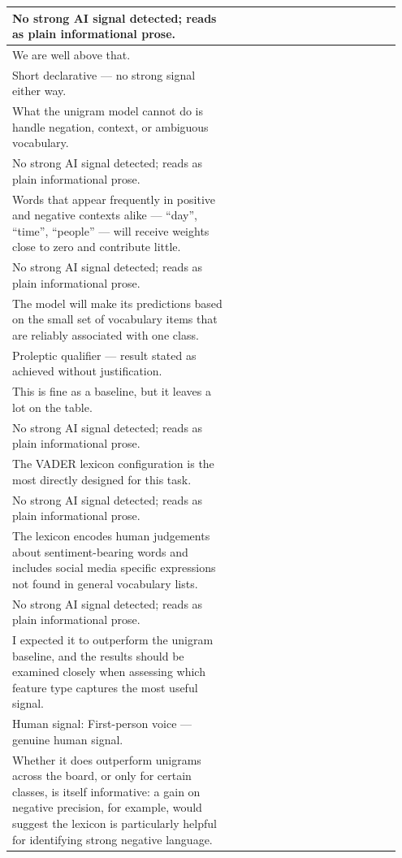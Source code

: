 \documentclass[11pt]{article}
\begin{document}
\begin{longtable}{|p{0.55\linewidth}|p{0.40\linewidth}|}
\hline
No strong AI signal detected; reads as plain informational prose. & \\
\hline
We are well above that. & \\[2pt]
\hline
Short declarative --- no strong signal either way. & \\
\hline
What the unigram model cannot do is handle negation, context, or ambiguous vocabulary. & \\[2pt]
\hline
No strong AI signal detected; reads as plain informational prose. & \\
\hline
Words that appear frequently in positive and negative contexts alike --- ``day'', ``time'', ``people'' --- will receive weights close to zero and contribute little. & \\[2pt]
\hline
No strong AI signal detected; reads as plain informational prose. & \\
\hline
The model will make its predictions based on the small set of vocabulary items that are reliably associated with one class. & \\[2pt]
\hline
Proleptic qualifier --- result stated as achieved without justification. & \\
\hline
This is fine as a baseline, but it leaves a lot on the table. & \\[2pt]
\hline
No strong AI signal detected; reads as plain informational prose. & \\
\hline
The VADER lexicon configuration is the most directly designed for this task. & \\[2pt]
\hline
No strong AI signal detected; reads as plain informational prose. & \\
\hline
The lexicon encodes human judgements about sentiment-bearing words and includes social media specific expressions not found in general vocabulary lists. & \\[2pt]
\hline
No strong AI signal detected; reads as plain informational prose. & \\
\hline
I expected it to outperform the unigram baseline, and the results should be examined closely when assessing which feature type captures the most useful signal. & \\[2pt]
\hline
Human signal: First-person voice --- genuine human signal. & \\
\hline
Whether it does outperform unigrams across the board, or only for certain classes, is itself informative: a gain on negative precision, for example, would suggest the lexicon is particularly helpful for identifying strong negative language. & \\[2pt]

\end{longtable}
\end{document}
